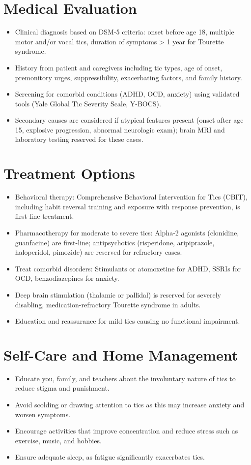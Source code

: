 \section*{Medical Evaluation}
\begin{itemize}
  \item Clinical diagnosis based on DSM-5 criteria: onset before age 18, multiple motor and/or vocal tics, duration of symptoms > 1 year for Tourette syndrome.
  \item History from patient and caregivers including tic types, age of onset, premonitory urges, suppressibility, exacerbating factors, and family history.
  \item Screening for comorbid conditions (ADHD, OCD, anxiety) using validated tools (Yale Global Tic Severity Scale, Y-BOCS).
  \item Secondary causes are considered if atypical features present (onset after age 15, explosive progression, abnormal neurologic exam); brain MRI and laboratory testing reserved for these cases.
\end{itemize}

\section*{Treatment Options}
\begin{itemize}
  \item Behavioral therapy: Comprehensive Behavioral Intervention for Tics (CBIT), including habit reversal training and exposure with response prevention, is first-line treatment.
  \item Pharmacotherapy for moderate to severe tics: Alpha-2 agonists (clonidine, guanfacine) are first-line; antipsychotics (risperidone, aripiprazole, haloperidol, pimozide) are reserved for refractory cases.
  \item Treat comorbid disorders: Stimulants or atomoxetine for ADHD, SSRIs for OCD, benzodiazepines for anxiety.
  \item Deep brain stimulation (thalamic or pallidal) is reserved for severely disabling, medication-refractory Tourette syndrome in adults.
  \item Education and reassurance for mild tics causing no functional impairment.
\end{itemize}

\section*{Self-Care and Home Management}
\begin{itemize}
  \item Educate you, family, and teachers about the involuntary nature of tics to reduce stigma and punishment.
  \item Avoid scolding or drawing attention to tics as this may increase anxiety and worsen symptoms.
  \item Encourage activities that improve concentration and reduce stress such as exercise, music, and hobbies.
  \item Ensure adequate sleep, as fatigue significantly exacerbates tics.
\end{itemize}

